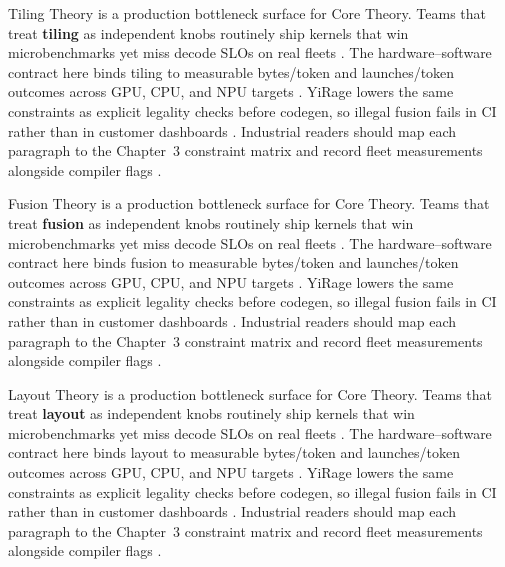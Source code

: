 Tiling Theory is a production bottleneck surface for Core Theory. Teams that treat \textbf{tiling} as independent knobs routinely ship kernels that win microbenchmarks yet miss decode SLOs on real fleets \citep{nvidia2024cudagraphs,taxbreak2026}. The hardware--software contract here binds tiling to measurable bytes/token and launches/token outcomes across GPU, CPU, and NPU targets \citep{liu2024deepseekv3,memoryfloor2026}. YiRage lowers the same constraints as explicit legality checks before codegen, so illegal fusion fails in CI rather than in customer dashboards \citep{patel2025llminference,nvidia2022hopper}. Industrial readers should map each paragraph to the Chapter~3 constraint matrix and record fleet measurements alongside compiler flags \citep{taxbreak2026,semianalysis2024tma}.

Fusion Theory is a production bottleneck surface for Core Theory. Teams that treat \textbf{fusion} as independent knobs routinely ship kernels that win microbenchmarks yet miss decode SLOs on real fleets \citep{liu2024deepseekv3,memoryfloor2026}. The hardware--software contract here binds fusion to measurable bytes/token and launches/token outcomes across GPU, CPU, and NPU targets \citep{patel2025llminference,nvidia2022hopper}. YiRage lowers the same constraints as explicit legality checks before codegen, so illegal fusion fails in CI rather than in customer dashboards \citep{taxbreak2026,semianalysis2024tma}. Industrial readers should map each paragraph to the Chapter~3 constraint matrix and record fleet measurements alongside compiler flags \citep{memoryfloor2026,amd2024xdna}.

Layout Theory is a production bottleneck surface for Core Theory. Teams that treat \textbf{layout} as independent knobs routinely ship kernels that win microbenchmarks yet miss decode SLOs on real fleets \citep{patel2025llminference,nvidia2022hopper}. The hardware--software contract here binds layout to measurable bytes/token and launches/token outcomes across GPU, CPU, and NPU targets \citep{taxbreak2026,semianalysis2024tma}. YiRage lowers the same constraints as explicit legality checks before codegen, so illegal fusion fails in CI rather than in customer dashboards \citep{memoryfloor2026,amd2024xdna}. Industrial readers should map each paragraph to the Chapter~3 constraint matrix and record fleet measurements alongside compiler flags \citep{nvidia2022hopper,amd2024aie}.

